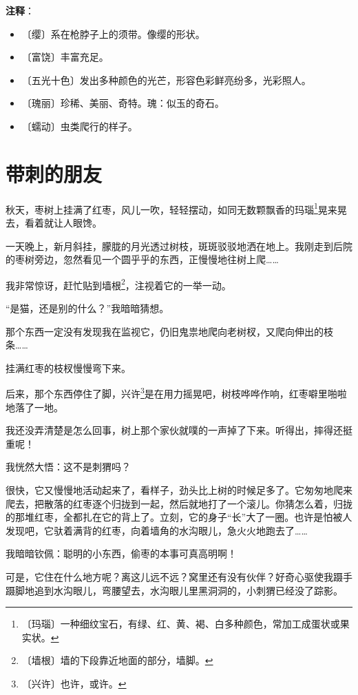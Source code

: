 \documentclass[12pt,UTF-8,openany]{ctexbook}
\begin{document}
\newpage

\textbf{注释}：

\vspace{-1em}

\begin{itemize}
    \setlength\itemsep{-0.2em}
    \item 〔缨〕系在枪脖子上的须带。像缨的形状。
    \item 〔富饶〕丰富充足。
    \item 〔五光十色〕发出多种颜色的光芒，形容色彩鲜亮纷多，光彩照人。
    \item 〔瑰丽〕珍稀、美丽、奇特。瑰：似玉的奇石。
    \item 〔蠕动〕虫类爬行的样子。
\end{itemize}

\chapter{带刺的朋友}

\begin{Large}
    
    秋天，枣树上挂满了红枣，风儿一吹，轻轻摆动，如同无数颗飘香的玛瑙\footnote{〔玛瑙〕一种细纹宝石，有绿、红、黄、褐、白多种颜色，常加工成蛋状或果实状。}晃来晃去，看着就让人眼馋。
    
    一天晚上，新月斜挂，朦胧的月光透过树枝，斑斑驳驳地洒在地上。我刚走到后院的枣树旁边，忽然看见一个圆乎乎的东西，正慢慢地往树上爬……
    
    我非常惊讶，赶忙贴到墙根\footnote{〔墙根〕墙的下段靠近地面的部分，墙脚。}，注视着它的一举一动。
    
    “是猫，还是别的什么？”我暗暗猜想。
    
    那个东西一定没有发现我在监视它，仍旧鬼祟地爬向老树杈，又爬向伸出的枝条……
    
    挂满红枣的枝杈慢慢弯下来。
    
    后来，那个东西停住了脚，兴许\footnote{〔兴许〕也许，或许。}是在用力摇晃吧，树枝哗哗作响，红枣噼里啪啦地落了一地。
    
    我还没弄清楚是怎么回事，树上那个家伙就噗的一声掉了下来。听得出，摔得还挺重呢！
    
    我恍然大悟：这不是刺猬吗？
    
    很快，它又慢慢地活动起来了，看样子，劲头比上树的时候足多了。它匆匆地爬来爬去，把散落的红枣逐个归拢到一起，然后就地打了一个滚儿。你猜怎么着，归拢的那堆红枣，全都扎在它的背上了。立刻，它的身子“长”大了一圈。也许是怕被人发现吧，它驮着满背的红枣，向着墙角的水沟眼儿，急火火地跑去了……
    
    我暗暗钦佩：聪明的小东西，偷枣的本事可真高明啊！
    
    可是，它住在什么地方呢？离这儿远不远？窝里还有没有伙伴？好奇心驱使我蹑手蹑脚地追到水沟眼儿，弯腰望去，水沟眼儿里黑洞洞的，小刺猬已经没了踪影。
    
\end{Large}
\end{document}
